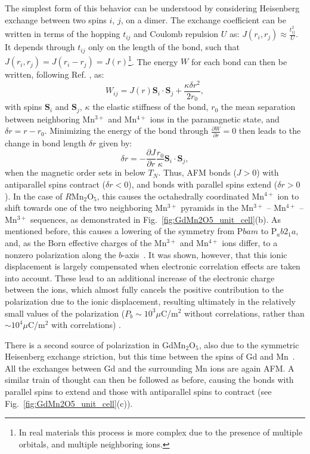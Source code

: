 The simplest form of this behavior can be understood by considering Heisenberg exchange between two spins $i$, $j$, on a dimer.
The exchange coefficient can be written in terms of the hopping $t_{ij}$ and Coulomb repulsion $U$ as: $J(r_i, r_j)\approx \frac{t_{ij}^2}{U}$.
It depends through $t_{ij}$ only on the length of the bond, such that $J(r_i, r_j) = J(r_i - r_j) = J(r)$\footnote{In real materials this process is more complex due to the presence of multiple orbitals, and multiple neighboring ions.}.
The energy $W$ for each bond can then be written, following Ref. \cite{Harris1972}, as:
\begin{equation}
	W_{ij} = J(r)\bm{S}_i \cdot \bm{S}_j + \frac{\kappa \delta r^2}{2r_0},
\end{equation}
with spins $\bm{S}_i$ and $\bm{S}_j$, $\kappa$ the elastic stiffness of the bond, $r_0$ the mean separation between neighboring Mn$^{3+}$ and Mn$^{4+}$ ions in the paramagnetic state, and $\delta r = r - r_0$.
Minimizing the energy of the bond through $\frac{\partial W}{\partial r} = 0$ then leads to the change in bond length $\delta r$ given by:
\begin{equation}
	\delta r = -\frac{\partial J}{\partial r}\frac{r_0}{\kappa}\bm{S}_i \cdot \bm{S}_j,
\end{equation}
when the magnetic order sets in below $T_N$. Thus, \gls{AFM} bonds ($J > 0$) with antiparallel spins contract ($\delta r < 0$), and bonds with parallel spins extend ($\delta r > 0$).
In the case of $R$Mn$_2$O$_5$, this causes the octahedrally coordinated Mn$^{4+}$ ion to shift towards one of the two neighboring Mn$^{3+}$ pyramids in the Mn$^{3+}$ -- Mn$^{4+}$ -- Mn$^{3+}$ sequences, as demonstrated in Fig.~\ref{fig:GdMn2O5_unit_cell}(b).
As mentioned before, this causes a lowering of the symmetry from P$bam$ to P$_ab2_1a$, and, as the Born effective charges of the Mn$^{3+}$ and Mn$^{4+}$ ions differ, to a nonzero polarization along the $b$-axis~\cite{Khomskii2009}.
It was shown, however, that this ionic displacement is largely compensated when electronic correlation effects are taken into account.
These lead to an additional increase of the electronic charge between the ions, which almost fully cancels the positive contribution to the polarization due to the ionic displacement, resulting ultimately in the relatively small values of the polarization ($P_b\sim 10^3 \mu $C/m$^2$ without correlations, rather than $\sim 10^4 \mu $C/m$^2$ with correlations) \cite{Giovannetti2008}.

There is a second source of polarization in GdMn$_2$O$_5$, also due to the symmetric Heisenberg exchange striction, but this time between the spins of Gd and Mn~\cite{Lee13}.
All the exchanges between Gd and the surrounding Mn ions are again \gls{AFM}.
A similar train of thought can then be followed as before, causing the bonds with parallel spins to extend and those with antiparallel spins to contract (see Fig.~\ref{fig:GdMn2O5_unit_cell}(c)).

